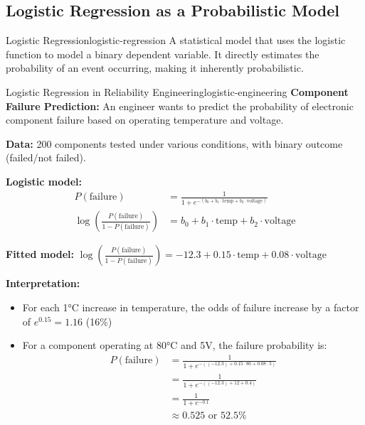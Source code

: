 \documentclass[12pt]{article}
\begin{document}
\subsection{Logistic Regression as a Probabilistic Model}

\begin{definition}{Logistic Regression}{logistic-regression}
A statistical model that uses the logistic function to model a binary dependent variable. It directly estimates the probability of an event occurring, making it inherently probabilistic.
\end{definition}

\begin{example}{Logistic Regression in Reliability Engineering}{logistic-engineering}
\textbf{Component Failure Prediction:} An engineer wants to predict the probability of electronic component failure based on operating temperature and voltage.

\textbf{Data:} 200 components tested under various conditions, with binary outcome (failed/not failed).

\textbf{Logistic model:}
\begin{align}
P(\text{failure}) &= \frac{1}{1 + e^{-(b_0 + b_1 \cdot \text{temp} + b_2 \cdot \text{voltage})}} \\
\log\left(\frac{P(\text{failure})}{1-P(\text{failure})}\right) &= b_0 + b_1 \cdot \text{temp} + b_2 \cdot \text{voltage}
\end{align}

\textbf{Fitted model:} $\log\left(\frac{P(\text{failure})}{1-P(\text{failure})}\right) = -12.3 + 0.15 \cdot \text{temp} + 0.08 \cdot \text{voltage}$

\textbf{Interpretation:} 
\begin{itemize}
    \item For each 1°C increase in temperature, the odds of failure increase by a factor of $e^{0.15} = 1.16$ (16\%)
    \item For a component operating at 80°C and 5V, the failure probability is:
    \begin{align}
    P(\text{failure}) &= \frac{1}{1 + e^{-((-12.3) + 0.15 \cdot 80 + 0.08 \cdot 5)}} \\
    &= \frac{1}{1 + e^{-((-12.3) + 12 + 0.4)}} \\
    &= \frac{1}{1 + e^{-0.1}} \\
    &\approx 0.525 \text{ or } 52.5\%
    \end{align}
\end{itemize}

\begin{center}
\end{center}
\end{example}
\end{document}
